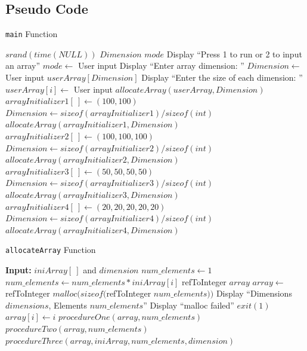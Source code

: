 \documentclass[10pt, conference]{IEEEtran}
\begin{document}
\begin{appendices}
\onecolumn
\section{Pseudo Code}
\label{Pseudo Appendix}

\begin{algorithm}[h!]
\caption{\texttt{main} Function}
\label{Main}
\begin{algorithmic} 

\STATE $srand(time(NULL))$
\STATE $Dimension$
\STATE $mode$
\STATE
\STATE Display ``Press 1 to run or 2 to input an array''
\STATE $mode \leftarrow$ User input
	\STATE Display ``Enter array dimension: ''
	\STATE $Dimension \leftarrow$ User input
	\STATE $userArray[Dimension]$
	\STATE Display ``Enter the size of each dimension: ''
		\STATE $userArray[i] \leftarrow$ User input
	\ENDFOR
	\STATE $allocateArray(userArray, Dimension)$
\ENDIF
\STATE
{}
	\STATE $arrayInitializer1[\ ] \leftarrow (100, 100)$
	\STATE $Dimension \leftarrow sizeof(arrayInitializer1)/sizeof(int)$
	\STATE $allocateArray(arrayInitializer1, Dimension)$
	\STATE
	\STATE $arrayInitializer2[\ ] \leftarrow (100, 100, 100)$
	\STATE $Dimension \leftarrow sizeof(arrayInitializer2)/sizeof(int)$
	\STATE $allocateArray(arrayInitializer2, Dimension)$
	\STATE
	\STATE $arrayInitializer3[\ ] \leftarrow (50, 50, 50, 50)$
	\STATE $Dimension \leftarrow sizeof(arrayInitializer3)/sizeof(int)$
	\STATE $allocateArray(arrayInitializer3, Dimension)$
	\STATE
	\STATE $arrayInitializer4[\ ] \leftarrow (20, 20, 20, 20, 20)$
	\STATE $Dimension \leftarrow sizeof(arrayInitializer4)/sizeof(int)$
	\STATE $allocateArray(arrayInitializer4, Dimension)$
\ENDIF

\end{algorithmic}
\end{algorithm}

\begin{algorithm}[h!]
\caption{\texttt{allocateArray} Function}
\label{allocateArray}
\begin{algorithmic} 

\STATE \textbf{Input:} $iniArray[\ ]$ and $dimension$
\STATE
\STATE $num\_elements \leftarrow 1$
	\STATE $num\_elements \leftarrow num\_elements * iniArray[i]$
\ENDFOR
\STATE refToInteger $array$
\STATE $array \leftarrow$ refToInteger $malloc(sizeof($refToInteger $num\_elements))$
\STATE Display ``Dimensions $dimensions$, Elements $num\_elements$''
\STATE
{}
	\STATE Display ``malloc failed''
	\STATE $exit(1)$
\ENDIF
\STATE
{}
	\STATE $array[i] \leftarrow i$
\ENDFOR
\STATE $procedureOne(array, num\_elements)$
\STATE $procedureTwo(array, num\_elements)$
\STATE $procedureThree(array, iniArray, num\_elements, dimension)$


\end{algorithmic}
\end{algorithm}
\end{appendices}
\end{document}
